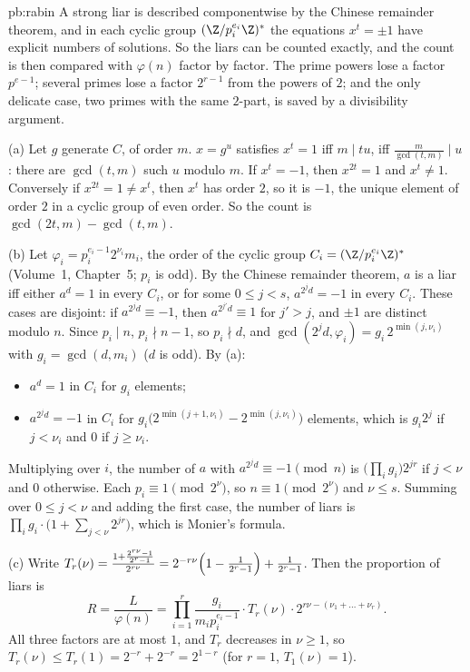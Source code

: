 \begin{solution}{pb:rabin}
\idea A strong liar is described componentwise by the Chinese remainder theorem, and in each cyclic group $(\Z/p_i^{e_i}\Z)^*$
the equations $x^t=\pm1$ have explicit numbers of solutions. So the liars can be counted exactly, and the count is then
compared with $\varphi(n)$ factor by factor. The prime powers lose a factor $p^{e-1}$; several primes lose a factor
$2^{r-1}$ from the powers of $2$; and the only delicate case, two primes with the same $2$-part, is saved by a
divisibility argument.

\writeup (a) Let $g$ generate $C$, of order $m$. $x=g^u$ satisfies $x^t=1$ iff $m\mid tu$, iff $\frac m{\gcd(t,m)}\mid u$: there are
$\gcd(t,m)$ such $u$ modulo $m$. If $x^t=-1$, then $x^{2t}=1$ and $x^t\ne1$. Conversely if $x^{2t}=1\ne x^t$, then $x^t$ has order $2$,
so it is $-1$, the unique element of order $2$ in a cyclic group of even order. So the count is $\gcd(2t,m)-\gcd(t,m)$.

(b) Let $\varphi_i=p_i^{e_i-1}2^{\nu_i}m_i$, the order of the cyclic group $C_i=(\Z/p_i^{e_i}\Z)^*$ (Volume~1, Chapter~5; $p_i$ is odd).
By the Chinese remainder theorem, $a$ is a liar iff either $a^d=1$ in every $C_i$, or for some $0\le j<s$, $a^{2^jd}=-1$ in every
$C_i$. These cases are disjoint: if $a^{2^jd}\equiv-1$, then $a^{2^{j'}d}\equiv1$ for $j'>j$, and $\pm1$ are distinct modulo $n$. Since
$p_i\mid n$, $p_i\nmid n-1$, so $p_i\nmid d$, and $\gcd(2^jd,\varphi_i)=g_i\,2^{\min(j,\nu_i)}$ with $g_i=\gcd(d,m_i)$ ($d$ is odd). By (a):
\begin{itemize}
\item $a^d=1$ in $C_i$ for $g_i$ elements;
\item $a^{2^jd}=-1$ in $C_i$ for $g_i\bigl(2^{\min(j+1,\nu_i)}-2^{\min(j,\nu_i)}\bigr)$ elements, which is $g_i2^j$ if $j<\nu_i$ and $0$ if
$j\ge\nu_i$.
\end{itemize}
Multiplying over $i$, the number of $a$ with $a^{2^jd}\equiv-1\pmod n$ is $\bigl(\prod_ig_i\bigr)2^{jr}$ if $j<\nu$ and $0$ otherwise.
Each $p_i\equiv1\pmod{2^\nu}$, so $n\equiv1\pmod{2^\nu}$ and $\nu\le s$. Summing over $0\le j<\nu$ and adding the first case, the
number of liars is $\prod_ig_i\cdot\bigl(1+\sum_{j<\nu}2^{jr}\bigr)$, which is Monier's formula.

(c) Write $T_r(\nu)=\frac{1+\frac{2^{r\nu}-1}{2^r-1}}{2^{r\nu}}=2^{-r\nu}\Bigl(1-\frac1{2^r-1}\Bigr)+\frac1{2^r-1}$. Then the proportion of liars is
\[
R=\frac{L}{\varphi(n)}=\prod_{i=1}^r\frac{g_i}{m_ip_i^{e_i-1}}\cdot T_r(\nu)\cdot2^{r\nu-(\nu_1+\dots+\nu_r)}.
\]
All three factors are at most $1$, and $T_r$ decreases in $\nu\ge1$, so $T_r(\nu)\le T_r(1)=2^{-r}+2^{-r}=2^{1-r}$ (for $r=1$,
$T_1(\nu)=1$).


\end{solution}
